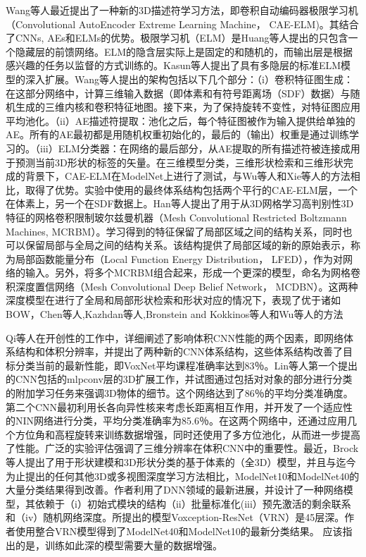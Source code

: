 Wang等人\cite{Wang2016An}最近提出了一种新的3D描述符学习方法，即卷积自动编码器极限学习机（Convolutional AutoEncoder Extreme Learning Machine， CAE-ELM)。其结合了CNNs, AEs和ELMs的优势。极限学习机（ELM）是Huang等人\cite{Huang2006Extreme}提出的只包含一个隐藏层的前馈网络。ELM的隐含层实际上是固定的和随机的，而输出层是根据感兴趣的任务以监督的方式训练的。Kasun等人\cite{Kasun2013Repre}提出了具有多隐层的标准ELM模型的深入扩展。Wang等人\cite{Wang2016An}提出的架构包括以下几个部分：（i）卷积特征图生成：在这部分网络中，计算三维输入数据（即体素和有符号距离场（SDF）数据）与随机生成的三维内核和卷积特征地图。接下来，为了保持旋转不变性，对特征图应用平均池化。（ii）AE描述符提取：池化之后，每个特征图被作为输入提供给单独的AE。所有的AE最初都是用随机权重初始化的，最后的（输出）权重是通过训练学习的。（iii）ELM分类器：在网络的最后部分，从AE提取的所有描述符被连接成用于预测当前3D形状的标签的矢量。在三维模型分类，三维形状检索和三维形状完成的背景下，CAE-ELM在ModelNet上进行了测试，与Wu等人\cite{Wu20143D}和Xie等人\cite{Xie2015Deepshape}的方法相比，取得了优势。实验中使用的最终体系结构包括两个平行的CAE-ELM层，一个在体素上，另一个在SDF数据上。Han等人\cite{Han2016Mesh}提出了用于从3D网格学习高判别性3D特征的网格卷积限制玻尔兹曼机器（Mesh Convolutional Restricted Boltzmann Machines, MCRBM）。学习得到的特征保留了局部区域之间的结构关系，同时也可以保留局部与全局之间的结构关系。该结构提供了局部区域的新的原始表示，称为局部函数能量分布（Local Function Energy Distribution， LFED），作为对网络的输入。另外，将多个MCRBM组合起来，形成一个更深的模型，命名为网格卷积深度置信网络（Mesh Convolutional Deep Belief Network， MCDBN）。这两种深度模型在进行了全局和局部形状检索和形状对应的情况下，表现了优于诸如BOW，Chen等人\cite{Chen2003On},Kazhdan等人\cite{Kazhdan2003Rotation},Bronstein and Kokkinos等人\cite{Bronstein2010Scale}和Wu等人\cite{Wu20143D}的方法

Qi等人\cite{Qi2016Volumetric}在开创性的工作中，详细阐述了影响体积CNN性能的两个因素，即网络体系结构和体积分辨率，并提出了两种新的CNN体​​系结构，这些体系结构改善了目标分类当前的最新性能，即VoxNet\cite{Maturana2015VoxNet}平均课程准确率达到83％。Lin等人\cite{Lin2013Network}第一个提出的CNN包括的mlpconv层的3D扩展工作，并试图通过包括对对象的部分进行分类的附加学习任务来强调3D物体的细节。这个网络达到了86％的平均分类准确度。第二个CNN最初利用长各向异性核来考虑长距离相互作用，并开发了一个适应性的NIN网络\cite{Lin2013Network}进行分类，平均分类准确率为85.6％。在这两个网络中，还通过应用几个方位角和高程旋转来训练数据增强，同时还使用了多方位池化，从而进一步提高了性能。广泛的实验评估强调了三维分辨率在体积CNN中的重要性。最近，Brock等人\cite{Brock2016Generative}提出了用于形状建模和3D形状分类的基于体素的（全3D）模型，并且与迄今为止提出的任何其他3D或多视图深度学习方法相比，ModelNet10和ModelNet40的大量分类结果得到改善。作者利用了DNN领域的最新进展，并设计了一种网络模型，其依赖于（i）初始式模块的结构\cite{Szegedy2016Inception}（ii）批量标准化\cite{Ioffe2015Batch}(iii）预先激活的剩余联系\cite{He2016Identity}和（iv）随机网络深度\cite{Huang2016Deep}。所提出的模型Voxception-ResNet（VRN）是45层深。作者使用整合VRN模型得到了ModelNet40和ModelNet10的最新分类结果。 应该指出的是，训练如此深的模型需要大量的数据增强。

